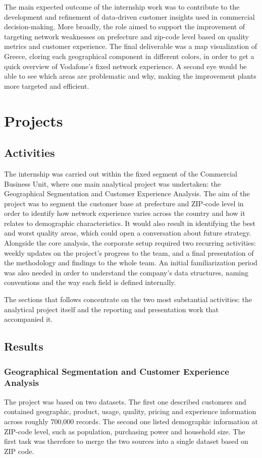 \documentclass[12pt, a4paper, oneside]{report}
\begin{document}
The main expected outcome of the internship work was to contribute to the development and refinement of data-driven customer insights used in commercial decision-making. More broadly, the role aimed to support the improvement of targeting network weaknesses on prefecture and zip-code level based on quality metrics and customer experience. The final deliverable was a map visualization of Greece, cloring each geographical component in different colors, in order to get a quick overview of Vodafone’s fixed network experience. A second eye would be able to see which areas are problematic and why, making the improvement plants more targeted and efficient. 


\chapter{Projects}

\section{Activities}
The internship was carried out within the fixed segment of the Commercial Business Unit, where one main analytical project was undertaken: the Geographical Segmentation and Customer Experience Analysis. The aim of the project was to segment the customer base at prefecture and ZIP-code level in order to identify how network experience varies across the country and how it relates to demographic characteristics. It would also result in identifying the best and worst quality areas, which could open a conversation about future strategy. Alongside the core analysis, the corporate setup required two recurring activities: weekly updates on the project's progress to the team, and a final presentation of the methodology and findings to the whole team. An initial familiarization period was also needed in order to understand the company's data structures, naming conventions and the way each field is defined internally.

The sections that follows concentrate on the two most substantial activities: the analytical project itself and the reporting and presentation work that accompanied it.

\section{Results}

\subsection{Geographical Segmentation and Customer Experience Analysis}
The project was based on two datasets. The first one described customers and contained geographic, product, usage, quality, pricing and experience information across roughly 700,000 records. The second one listed demographic information at ZIP-code level, such as population, purchasing power and household size. The first task was therefore to merge the two sources into a single dataset based on ZIP code.
\end{document}
